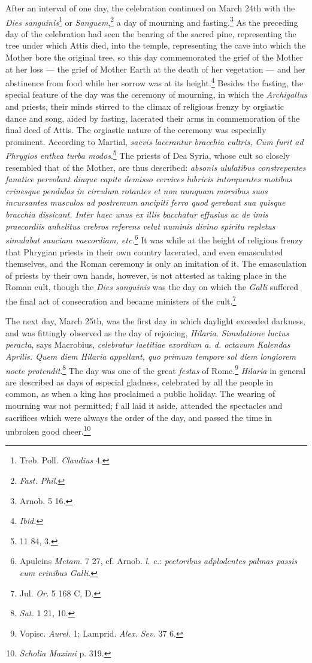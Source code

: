 \documentclass[a4paper, 11pt, oneside, polutonikogreek, english]{article}
\begin{document}
After an interval of one day, the celebration continued on March 24th with the \emph{Dies sanguinis}\footnote{Treb. Poll. \emph{Claudius} 4.} or \emph{Sanguem},\footnote{\emph{Fast. Phil.}} a day of mourning and fasting.\footnote{Arnob. 5 16.} As the preceding day of the celebration had seen the bearing of the sacred pine, representing the tree under which Attis died, into the temple, representing the cave into which the Mother bore the original tree, so this day commemorated the grief of the Mother at her loss --- the grief of Mother Earth at the death of her vegetation --- and her abstinence from food while her sorrow was at its height.\footnote{\emph{Ibid.}} Besides the fasting, the special feature of the day was the ceremony of mourning, in which the \emph{Archigallus} and priests, their minds stirred to the climax of religious frenzy by orgiastic dance and song, aided by fasting, lacerated their arms in commemoration of the final deed of Attis. The orgiastic nature of the ceremony was especially prominent. According to Martial, \emph{saevis lacerantur bracchia cultris, Cum furit ad Phrygios enthea turba modos}.\footnote{11 84, 3.} The priests of Dea Syria, whose cult so closely resembled that of the Mother, are thus described: \emph{absonis ululatibus constrepentes fanatice pervolant diuque capite demisso cervices lubricis intorquentes motibus crinesque pendulos in circulum rotantes et non nunquam morsibus suos incursantes musculos ad postremum ancipiti ferro quod gerebant sua quisque bracchia dissicant. Inter haec unus ex illis bacchatur effusius ac de imis praecordiis anhelitus crebros referens velut numinis divino spiritu repletus simulabat sauciam vaecordiam, etc.}\footnote{Apuleins \emph{Metam.} 7 27, cf. Arnob. \emph{l. c.}: \emph{pectoribus adplodentes palmas passis cum crinibus Galli}.} It was while at the height of religious frenzy that Phrygian priests in their own country lacerated, and even emasculated themselves, and the Roman ceremony is only an imitation of it. The emasculation of priests by their own hands, however, is not attested as taking place in the Roman cult, though the \emph{Dies sanguinis} was the day on which the \emph{Galli} suffered the final act of consecration and became ministers of the cult.\footnote{Jul. \emph{Or.} 5 168 C, D.}

The next day, March 25th, was the first day in which daylight exceeded darkness, and was fittingly observed as the day of rejoicing, \emph{Hilaria}. \emph{Simulatione luctus peracta}, says Macrobius, \emph{celebratur laetitiae exordium a. d. octavum Kalendas Aprilis. Quem diem Hilaria appellant, quo primum tempore sol diem longiorem nocte protendit}.\footnote{\emph{Sat.} 1 21, 10.} The day was one of the great \emph{festas} of Rome.\footnote{Vopisc. \emph{Aurel.} 1; Lamprid. \emph{Alex. Sev.} 37 6.} \emph{Hilaria} in general are described as days of especial gladness, celebrated by all the people in common, as when a king has proclaimed a public holiday. The wearing of mourning was not permitted; f all laid it aside, attended the spectacles and sacrifices which were always the order of the day, and passed the time in unbroken good cheer.\footnote{\emph{Scholia Maximi} p. 319.}
\end{document}
